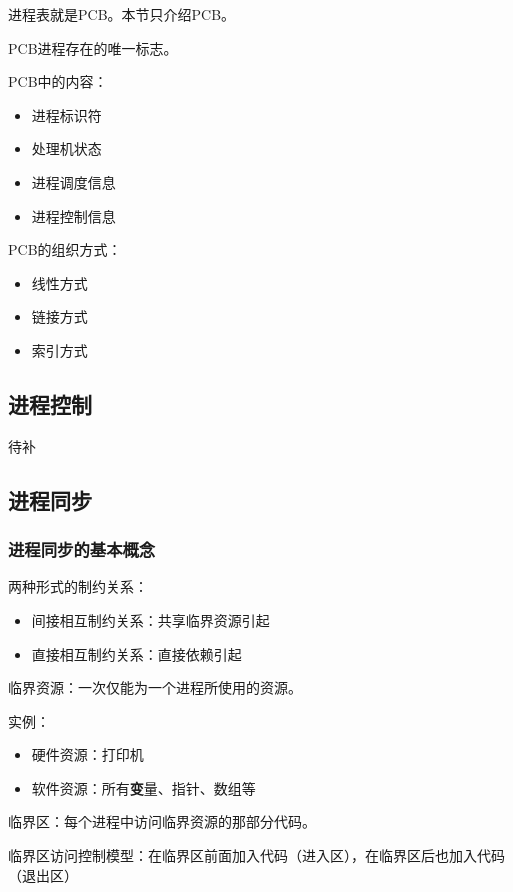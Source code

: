 \documentclass[12pt, a4paper, oneside]{ctexart}
\begin{document}
进程表就是PCB。本节只介绍PCB。

PCB进程存在的唯一标志。

\begin{multicols}{2}
PCB中的内容：
\begin{itemize}
    \item 进程标识符
    \item 处理机状态
    \item 进程调度信息
    \item 进程控制信息
\end{itemize}

PCB的组织方式：
\begin{itemize}
    \item 线性方式
    \item 链接方式
    \item 索引方式
\end{itemize}
\end{multicols}

\subsection{进程控制}

待补

\subsection{进程同步}

\subsubsection{进程同步的基本概念}

两种形式的制约关系：
\begin{itemize}
    \item 间接相互制约关系：共享临界资源引起
    \item 直接相互制约关系：直接依赖引起
\end{itemize}

临界资源：一次仅能为一个进程所使用的资源。

实例：
\begin{itemize}
    \item 硬件资源：打印机
    \item 软件资源：所有\textbf{变}量、指针、数组等
\end{itemize}

临界区：每个进程中访问临界资源的那部分代码。

临界区访问控制模型：在临界区前面加入代码（进入区），在临界区后也加入代码（退出区）
\end{document}
